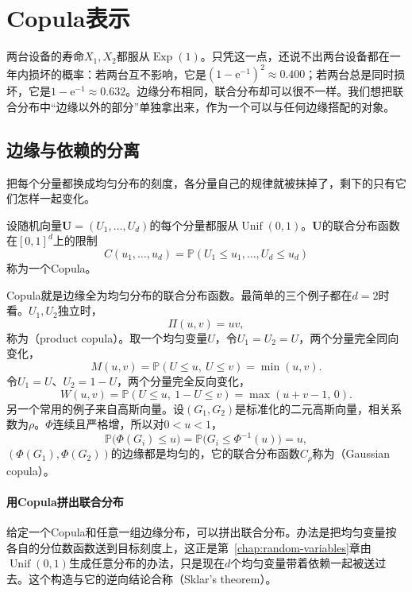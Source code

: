 \section{Copula表示}
\label{sec:dfam-copulas}

两台设备的寿命$X_1,X_2$都服从$\operatorname{Exp}(1)$。只凭这一点，还说不出两台设备都在一年内损坏的概率：若两台互不影响，它是$(1-\mathrm{e}^{-1})^{2}\approx0.400$；若两台总是同时损坏，它是$1-\mathrm{e}^{-1}\approx0.632$。边缘分布相同，联合分布却可以很不一样。我们想把联合分布中“边缘以外的部分”单独拿出来，作为一个可以与任何边缘搭配的对象。

\subsection{边缘与依赖的分离}
\label{sec:dfam-copula-separation}

把每个分量都换成均匀分布的刻度，各分量自己的规律就被抹掉了，剩下的只有它们怎样一起变化。

\begin{definition}[Copula]
\label{def:dfam-copula}
设随机向量$\bm{U}=(U_1,\dots,U_d)$的每个分量都服从$\operatorname{Unif}(0,1)$。$\bm{U}$的联合分布函数在$[0,1]^{d}$上的限制
\begin{equation}
  C(u_1,\dots,u_d)=\mathbb{P}(U_1\leq u_1,\dots,U_d\leq u_d)
  \label{eq:dfam-copula}
\end{equation}
称为一个Copula。
\end{definition}

Copula就是边缘全为均匀分布的联合分布函数。最简单的三个例子都在$d=2$时看。$U_1,U_2$独立时，
\[
  \Pi(u,v)=uv ,
\]
称为（product copula）。取一个均匀变量$U$，令$U_1=U_2=U$，两个分量完全同向变化，
\[
  M(u,v)=\mathbb{P}(U\leq u,\ U\leq v)=\min(u,v).
\]
令$U_1=U$、$U_2=1-U$，两个分量完全反向变化，
\[
  W(u,v)=\mathbb{P}(U\leq u,\ 1-U\leq v)=\max(u+v-1,\,0).
\]
另一个常用的例子来自高斯向量。设$(G_1,G_2)$是标准化的二元高斯向量，相关系数为$\rho$。$\Phi$连续且严格增，所以对$0<u<1$，
\[
  \mathbb{P}\bigl(\Phi(G_i)\leq u\bigr)=\mathbb{P}\bigl(G_i\leq\Phi^{-1}(u)\bigr)=u ,
\]
$(\Phi(G_1),\Phi(G_2))$的边缘都是均匀的，它的联合分布函数$C_\rho$称为（Gaussian copula）。

\paragraph{用Copula拼出联合分布}
给定一个Copula和任意一组边缘分布，可以拼出联合分布。办法是把均匀变量按各自的分位数函数送到目标刻度上，这正是第~\ref{chap:random-variables}章由$\operatorname{Unif}(0,1)$生成任意分布的办法，只是现在$d$个均匀变量带着依赖一起被送过去。这个构造与它的逆向结论合称（Sklar's theorem）。

